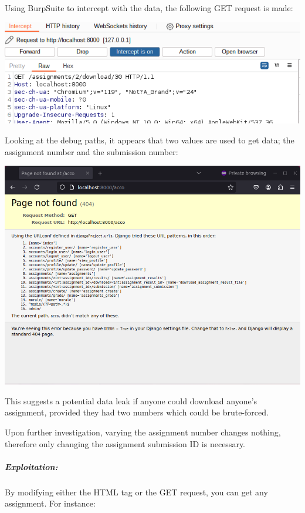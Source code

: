 Using BurpSuite to intercept with the data, the following GET request is made:

\begin{center}
    \includegraphics[width = \linewidth]{images/Michelle/interceptget.png}
\end{center}

Looking at the debug paths, it appears that two values are used to get data; the assignment number and the submission number:

\begin{center}
    \includegraphics[width = \linewidth]{images/Michelle/debug.png}
\end{center}

This suggests a potential data leak if anyone could download anyone's assignment, provided they had two numbers which could be brute-forced.

Upon further investigation, varying the assignment number changes nothing, therefore only changing the assignment submission ID is necessary.

\subparagraph{Exploitation:}

By modifying either the HTML tag or the GET request, you can get any assignment. For instance:

